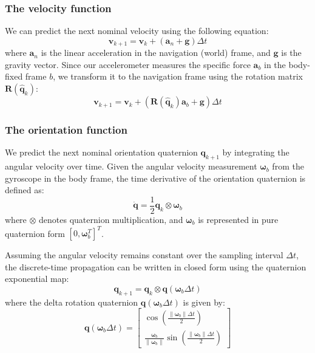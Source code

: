 \documentclass{article}
\begin{document}
	
	\subsubsection{The velocity function}
	We can predict the next nominal velocity using the following equation:
	\begin{equation}
		\mathbf{v}_{k+1} = \mathbf{v}_k + (\mathbf{a}_n + \mathbf{g}) \Delta t
	\end{equation}
	where $\mathbf{a}_n$ is the linear acceleration in the navigation (world) frame, and $\mathbf{g}$ is the gravity vector. Since our accelerometer measures the specific force $\mathbf{a}_b$ in the body-fixed frame $b$, we transform it to the navigation frame using the rotation matrix $\mathbf{R}(\hat{\mathbf{q}}_k)$:
	\begin{equation}
	\mathbf{v}_{k+1} = \mathbf{v}_k + \left( \mathbf{R}(\hat{\mathbf{q}}_k) \mathbf{a}_b + \mathbf{g} \right) \Delta t
	\end{equation}
	
	\subsubsection{The orientation function}
	We predict the next nominal orientation quaternion $\mathbf{q}_{k+1}$ by integrating the angular velocity over time. Given the angular velocity measurement $\boldsymbol{\omega}_b$ from the gyroscope in the body frame, the time derivative of the orientation quaternion is defined as:
	\begin{equation}
		\dot{\mathbf{q}} = \frac{1}{2} \mathbf{q}_k \otimes \boldsymbol{\omega}_b
	\end{equation}
	where $\otimes$ denotes quaternion multiplication, and $\boldsymbol{\omega}_b$ is represented in pure quaternion form $[0, \boldsymbol{\omega}_b^T]^T$. 
	
	Assuming the angular velocity remains constant over the sampling interval $\Delta t$, the discrete-time propagation can be written in closed form using the quaternion exponential map:
	\begin{equation}
		\mathbf{q}_{k+1} = \mathbf{q}_k \otimes \mathbf{q}\left(\boldsymbol{\omega}_b \Delta t\right)
	\end{equation}
	where the delta rotation quaternion $\mathbf{q}\left(\boldsymbol{\omega}_b \Delta t\right)$ is given by:
	\begin{equation}
		\mathbf{q}\left(\boldsymbol{\omega}_b \Delta t\right) = 
		\begin{bmatrix} 
			\cos\left(\frac{\|\boldsymbol{\omega}_b\| \Delta t}{2}\right) \\ 
			\frac{\boldsymbol{\omega}_b}{\|\boldsymbol{\omega}_b\|} \sin\left(\frac{\|\boldsymbol{\omega}_b\| \Delta t}{2}\right) 
		\end{bmatrix}
	\end{equation}
	
\end{document}
